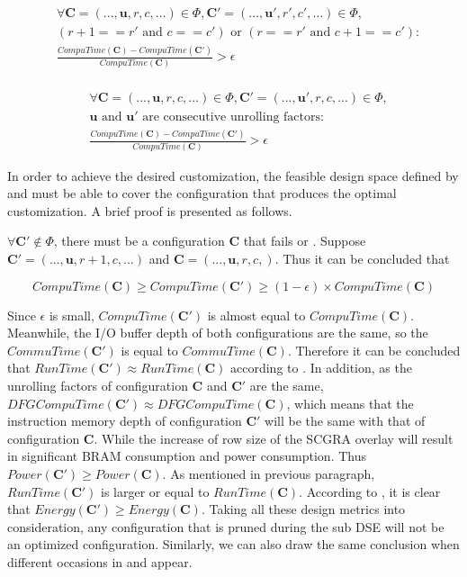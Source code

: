 \begin{equation} \label{eq:cond1}
    \begin{split}
        &\forall \bm{C}=(...,\bm{u},r,c,...)\in \Phi, \bm{C'}=(...,\bm{u'},r',c',...) \in \Phi, \\
        & (r+1==r' \text{ and } c==c') \text{ or } (r==r' \text{ and } c+1==c'): \\ 
        &\frac{CompuTime(\bm{C})-CompuTime(\bm{C'})}{CompuTime(\bm{C})} > \epsilon \\
    \end{split}
\end{equation}

\begin{equation} \label{eq:cond2}
    \begin{split}
        &\forall \bm{C}=(...,\bm{u},r,c,...) \in \Phi, \bm{C'}=(...,\bm{u'},r,c,...) \in \Phi,\\ 
        &\bm{u} \text{ and } \bm{u'} \text{ are consecutive unrolling factors}: \\
        &\frac{CompuTime(\bm{C})-CompuTime(\bm{C'})}{CompuTime(\bm{C})} > \epsilon
    \end{split}
\end{equation}

In order to achieve the desired customization, the feasible design space defined by  and  must be able to cover the configuration that produces the optimal customization. A brief proof is presented as follows.

$\forall \bm{C'} \notin \Phi$, there must be a configuration $\bm{C}$ that fails  or . Suppose $\bm{C'}=(...,\bm{u},r+1,c,...)$ and $\bm{C}=(...,\bm{u},r,c,)$. Thus it can be concluded that 

\begin{equation}
   CompuTime(\bm{C}) \geq  CompuTime(\bm{C'}) \geq (1-\epsilon) \times CompuTime(\bm{C})
\end{equation}

Since $\epsilon$ is small, $CompuTime(\bm{C'})$ is almost equal to $CompuTime(\bm{C})$. Meanwhile, the I/O buffer depth of both configurations are the same, so the $CommuTime(\bm{C'})$ is equal to $CommuTime(\bm{C})$. Therefore it can be concluded that $RunTime(\bm{C'}) \approx RunTime(\bm{C})$ according to . In addition, as the unrolling factors of configuration $\bm{C}$ and $\bm{C'}$ are the same, $DFGCompuTime(\bm{C'}) \approx DFGCompuTime(\bm{C})$, which means that the instruction memory depth of configuration $\bm{C'}$ will be the same with that of configuration $\bm{C}$. While the increase of row size of the SCGRA overlay will result in significant BRAM consumption and power consumption. Thus $Power(\bm{C'}) \geq Power(\bm{C})$. As mentioned in previous paragraph, $RunTime(\bm{C'})$ is larger or equal to $RunTime(\bm{C})$. According to , it is clear that $Energy(\bm{C'}) \geq Energy(\bm{C})$. Taking all these design metrics into consideration, any configuration that is pruned during the sub DSE will not be an optimized configuration. Similarly, we can also draw the same conclusion when different occasions in  and  appear.


